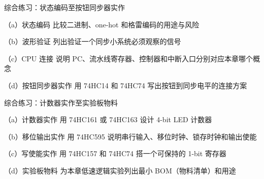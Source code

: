 \begin{chapterexercise}{综合练习：状态编码至按钮同步器实作}
\begin{exercisesubproblem}{（a）状态编码}
比较二进制、one-hot 和格雷编码的用途与风险
\end{exercisesubproblem}
\begin{exercisesubproblem}{（b）波形验证}
列出验证一个同步小系统必须观察的信号
\end{exercisesubproblem}
\begin{exercisesubproblem}{（c）CPU 连接}
说明 PC、流水线寄存器、控制器和中断入口分别对应本章哪个概念
\end{exercisesubproblem}
\begin{exercisesubproblem}{（d）按钮同步器实作}
用 74HC14 和 74HC74 写出按钮到同步电平的连接方案
\end{exercisesubproblem}
\end{chapterexercise}

\begin{chapterexercise}{综合练习：计数器实作至实验板物料}
\begin{exercisesubproblem}{（a）计数器实作}
用 74HC161 或 74HC163 设计 4-bit LED 计数器
\end{exercisesubproblem}
\begin{exercisesubproblem}{（b）移位输出实作}
用 74HC595 说明串行输入、移位时钟、锁存时钟和输出使能
\end{exercisesubproblem}
\begin{exercisesubproblem}{（c）写使能实作}
用 74HC157 和 74HC74 搭一个可保持的 1-bit 寄存器
\end{exercisesubproblem}
\begin{exercisesubproblem}{（d）实验板物料}
为本章低速逻辑实验列出最小 BOM（物料清单）和用途
\end{exercisesubproblem}
\end{chapterexercise}

